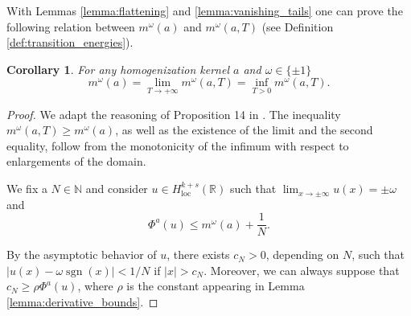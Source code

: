\documentclass{article}
\newtheorem{Corollary}[Theorem]{Corollary}
\theoremstyle{definition}
\newcommand{\abs}[1]{\left|#1\right|}
\newcommand{\R}{\mathbb{R}}
\newcommand{\N}{\mathbb{N}}
\newcommand{\sgn}{\operatorname{sgn}}
\newcommand{\Edo}[1]{{\color{red}#1} }
\begin{document}
With Lemmas \ref{lemma:flattening} and \ref{lemma:vanishing_tails} one can prove the following relation between $m^\omega(a)$ and $m^\omega(a,T)$ (see Definition \ref{def:transition_energies}). %

\begin{Corollary}\label{coroll:min_equivalence}
For any homogenization kernel $a$ and $\omega\in \{\pm 1\}$
    \[m^{\omega}(a) = \lim_{T\rightarrow +\infty} m^{\omega}(a,T) = \inf_{T>0} m^{\omega}(a,T).\]
\end{Corollary}
 
\begin{proof} We adapt the reasoning of Proposition 14 in \cite{Solci_2024}. The inequality $m^\omega(a,T) \geq m^\omega(a)$, as well as the existence of the limit and the second equality, follow from the monotonicity of the infimum with respect to enlargements of the domain. 

 We fix a $N\in\N$ and consider $u\in H^{k+s}_{\operatorname{loc}}(\R)$ such that $\lim_{x\to \pm\infty} u(x) = \pm \omega$ and
    \begin{equation}
        \label{cor bound 1}
        \Phi^{a}(u) \leq m^\omega(a) + \frac{1}{N}.
    \end{equation}
      
    By the asymptotic behavior of $u$, there exists $c_N >0$, depending on $N$, such that $\abs{u(x)-\omega \sgn(x)}<1/N$ if $|x|> c_N$. Moreover, we can always suppose that $c_N\geq \rho \Phi^a(u)$, where $\rho$ is the constant appearing in Lemma \ref{lemma:derivative_bounds}.
    

\end{proof}
\end{document}
